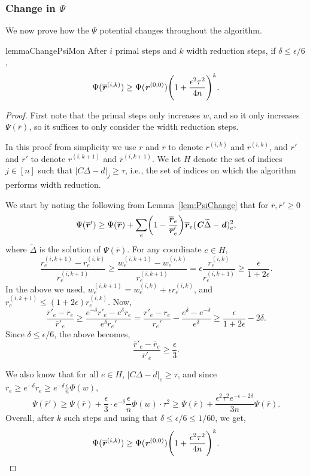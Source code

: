 \documentclass[11pt]{article}
\let\originalleft\left
\let\originalright\right
\renewcommand{\left}{\mathopen{}\mathclose\bgroup\originalleft}
\renewcommand{\right}{\aftergroup\egroup\originalright}
\newcommand\dd{\boldsymbol{\mathit{d}}}
\newcommand\rr{\boldsymbol{\mathit{r}}}
\newcommand\ww{\boldsymbol{\mathit{w}}}
\newcommand\rrbar{\overline{\boldsymbol{\mathit{r}}}}
\newcommand\CC{\boldsymbol{\mathit{C}}}
\begin{document}
\subsubsection*{Change in $\Psi$}


We now prove how the $\Psi$ potential changes throughout the algorithm.
\begin{restatable}{lemma}{ChangePsiMon}
\label{lem:ChangePsiMon}
After $i$ primal steps and $k$ width reduction steps, if $\delta \leq \epsilon/6$,
\[
\Psi(\rrbar^{(i,k)})\geq \Psi(\rr^{(0,0)})\left(1  +\frac{\epsilon^2\tau^2}{4  n}\right)^k.
\]

\end{restatable}
\begin{proof}
First note that the primal steps only increases $\ww$, and so it only increases $\Psi(\rrbar)$, so it suffices to only consider the width reduction steps.

In this proof from simplicity we use $\rr$ and $\rrbar$ to denote $\rr^{(i,k)}$ and $\rrbar^{(i,k)}$, and $\rr'$ and $\rrbar'$ to denote $\rr^{(i,k+1)}$ and $\rrbar^{(i,k+1)}$. We let $H$ denote the set of indices $j \in [n]$ such that $|\CC\Delta-\dd|_j \geq \tau $, i.e., the set of indices on which the algorithm performs width reduction.

We start by noting the following from Lemma~\ref{lem:PsiChange} that for $\rrbar, \rrbar' \geq 0$
\[
\Psi(\rrbar')\geq \Psi(\rrbar) + \sum_e \left(1-\frac{\rrbar_e}{\rrbar_e'}\right)\rrbar_e(\CC\widetilde{\Delta}-\dd)_e^2,
\]
where $\widetilde{\Delta}$ is the solution of $\Psi(\rrbar)$.
For any coordinate $e \in H$, 
\[
\frac{\rr^{(i,k+1)}_e-\rr^{(i,k)}_e}{\rr_e^{(i,k+1)}} \geq \frac{\ww^{(i,k+1)}_e-\ww^{(i,k)}_e}{\rr_e^{(i,k+1)}} = \epsilon \frac{\rr^{(i,k)}_e}{\rr^{(i,k+1)}_e  }\geq \frac{\epsilon}{1+2\epsilon}.
\]
In the above we used, $\ww_e^{(i,k+1)} = \ww_e^{(i,k)} + \epsilon \rr_e^{(i,k)}$, and  $\rr_e^{(i,k+1)}\leq (1+2\epsilon)\rr_e^{(i,k)}$. 
Now,
\[
\frac{\rrbar'_e - \rrbar_e}{\rrbar'_e}\geq \frac{e^{-\delta} \rr'_e - e^{\delta} \rr_e}{e^{\delta} \rr_e'} = \frac{\rr'_e - \rr_e}{\rr_e'} - \frac{e^{\delta} - e^{-\delta}}{e^{\delta}} \geq \frac{\epsilon}{1+2\epsilon} - 2 \delta.
\]
Since $\delta \leq \epsilon/6$, the above becomes,
\[
\frac{\rrbar'_e - \rrbar_e}{\rrbar'_e}\geq \frac{\epsilon}{3}.
\]



We also know that for all $e \in H$, $|\CC\Delta-\dd|_e\geq \tau$, and since $\rrbar_e \geq e^{-\delta} \rr_e \geq e^{-\delta} \frac{\epsilon}{n} \Phi(\ww)$,
\[
\Psi(\rrbar')\geq \Psi(\rrbar) +  \frac{\epsilon}{3} \cdot e^{-\delta} \frac{\epsilon}{n}\Phi(\ww) \cdot \tau^2 \geq \Psi(\rrbar) + \frac{\epsilon^2 \tau^2 e^{-\epsilon - 2 \delta}}{3 n}\Psi(\rrbar).
\]
Overall, after $k$ such steps and using that $\delta \leq \epsilon/6\leq 1/60$, we get,
\[
\Psi(\rrbar^{(i,k)})\geq \Psi(\rr^{(0,0)})\left(1  +\frac{\epsilon^2\tau^2}{4 n}\right)^k.
\]
\end{proof}
\end{document}
